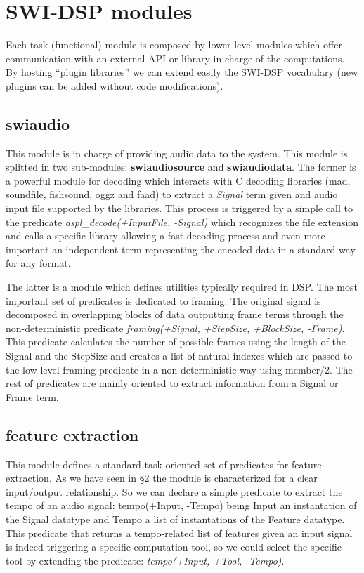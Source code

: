 \documentclass[runningheads]{llncs}
\begin{document}
\section{SWI-DSP modules}\label{sec:modules}

Each task (functional) module is composed by lower level modules which offer communication with an external API or library in charge of the computations. By hosting ``plugin libraries'' we can extend easily the SWI-DSP vocabulary (new plugins can be added without code modifications).

\subsection{swiaudio}\label{subsec:swiaudio}

This module is in charge of providing audio data to the system. This module is splitted in two sub-modules: \textbf{swiaudiosource} and \textbf{swiaudiodata}. The former is a powerful module for decoding which interacts with C decoding libraries (mad, soundfile, fishsound, oggz and faad) to extract a \textit{Signal} term given and audio input file supported by the libraries. This process is triggered by a simple call to the predicate \textit{aspl\_decode(+InputFile, -Signal)} which recognizes the file extension and calls a specific library allowing a fast decoding process and even more important an independent term representing the encoded data in a standard way for any format.

The latter is a module which defines utilities typically required in DSP. The most important set of predicates is dedicated to framing. The original signal is decomposed in overlapping blocks of data outputting frame terms through the non-deterministic predicate \textit{framing(+Signal, +StepSize, +BlockSize, -Frame)}. This predicate calculates the number of possible frames using the length of the Signal and the StepSize and creates a list of natural indexes which are passed to the low-level framing predicate in a non-deterministic way using member/2. The rest of predicates are mainly oriented to extract information from a Signal or Frame term.

\subsection{feature extraction}\label{subsec:swivamp}

This module defines a standard task-oriented set of predicates for feature extraction. As we have seen in \S 2 the module is characterized for a clear input/output relationship. So we can declare a simple predicate to extract the tempo of an audio signal: tempo(+Input, -Tempo) being Input an instantation of the Signal datatype and Tempo a list of instantations of the Feature datatype. This predicate that returns a tempo-related list of features given an input signal is indeed triggering a specific computation tool, so we could select the specific tool by extending the predicate: \textit{tempo(+Input, +Tool, -Tempo)}.
\end{document}
